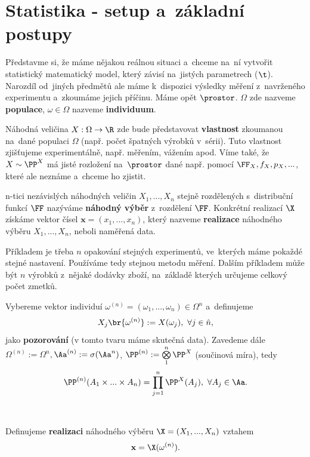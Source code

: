 \chapter{Statistika - setup a~základní postupy}
Představme si, že máme nějakou reálnou situaci a~chceme na~ní vytvořit statistický matematický model, který závisí na~jistých parametrech ($\t$). Narozdíl od~jiných předmětů ale máme k~dispozici výsledky měření z~navrženého experimentu a~zkoumáme jejich příčinu. Máme opět $\prostor$. $\Omega$ zde nazveme \textbf{populace}, $\omega\in\Omega$ nazveme \textbf{individuum}. 

Náhodná veličina $X:\Omega\to\R$ zde bude představovat \textbf{vlastnost} zkoumanou na~dané populaci $\Omega$ (např. počet špatných výrobků v~sérii). Tuto vlastnost zjišťujeme experimentálně, např. měřením, vážením apod. Víme také, že $X\sim\PP^X$ má jisté rozložení na~$\prostor$ dané např. pomocí  $\FF_X,f_X,p_X,...$, které ale neznáme a~chceme ho zjistit. 
\begin{define}
	n-tici nezávislých náhodných veličin $X_1,...,X_n$ stejně rozdělených s~distribuční funkcí $\FF$ nazýváme \textbf{náhodný výběr} z~rozdělení $\FF$. Konkrétní realizací $\X$ získáme vektor čísel $\textbf{x}=(x_1,...,x_n)$, který nazveme \textbf{realizace} náhodného výběru $X_1,...,X_n$, neboli naměřená data.
\end{define}
\begin{example}
	Příkladem je třeba $n$ opakování stejných experimentů, ve~kterých máme pokaždé stejné nastavení. Používáme tedy stejnou metodu měření. Dalším příkladem může být $n$ výrobků z~nějaké dodávky zboží, na~základě kterých určujeme celkový počet zmetků.
\end{example}

\begin{define} 
	Vybereme vektor individuí $\omega^{(n)}=(\omega_1,...,\omega_n)\in\Omega^n$ a~definujeme $$X_j\br{\omega^{(n)}}:=X(\omega_j),~\forall j\in\hat{n},$$ jako \textbf{pozorování} (v tomto tvaru máme skutečná data). Zavedeme dále $\Omega^{(n)}:=\Omega^n,$\newline$\Aa^{(n)}:=\sigma(\Aa^n)$, $\PP^{(n)}:=\bigotimes\limits_{1}^n \PP^X$ (součinová míra), tedy $$ \PP^{(n)}(A_1\times ...\times A_n)=\prod\limits_{j=1}^n \PP^X(A_j),~\forall A_j\in\Aa .$$
\\ \\
 Definujeme
	\textbf{realizaci} náhodného výběru $\X=(X_1,...,X_n)$ vztahem $$\textbf{x}=\X(\omega^{(n)}).$$
\end{define}

